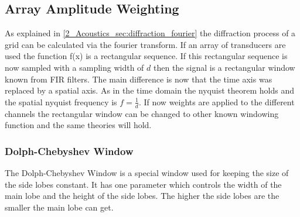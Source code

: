 \subsection{Array Amplitude Weighting}
As explained in \ref{2_Acoustics_sec:diffraction_fourier} the diffraction process of a grid can be calculated via the fourier transform. If an array of transducers are used the function f(x) is a rectangular sequence. If this rectangular sequence is now sampled with a sampling width of $d$ then the signal is a rectangular window known from FIR filters. The main difference is now that the time axis was replaced by a spatial axis. As in the time domain the nyquist theorem holds and the spatial nyquist frequency is $f = \frac{1}{d}$.
If now weights are applied to the different channels the rectangular window can be changed to other known windowing function and the same theories will hold. 
\subsubsection{Dolph-Chebyshev Window}
The Dolph-Chebyshev Window is a special window used for keeping the size of the side lobes constant. It has one parameter which controls the width of the main lobe and the height of the side lobes. The higher the side lobes are the smaller the main lobe can get. 




